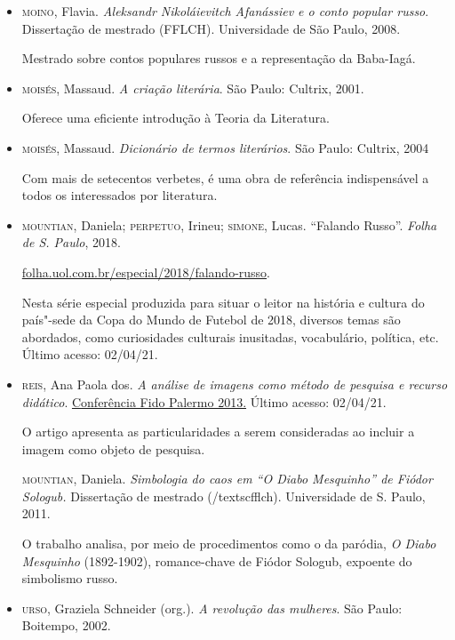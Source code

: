 \documentclass[11pt]{extarticle}
\begin{document}
\begin{itemize}
\item \textsc{moino}, Flavia. \emph{Aleksandr Nikoláievitch Afanássiev e o conto popular russo}. Dissertação de mestrado (FFLCH). Universidade de São Paulo, 2008.

Mestrado sobre contos populares russos e a representação da Baba-Iagá.

\item \textsc{moisés}, Massaud. \emph{A criação literária}. São Paulo: Cultrix, 2001.

Oferece uma eficiente introdução à Teoria da Literatura.

\item \textsc{moisés}, Massaud. \emph{Dicionário de termos literários}. São Paulo:
Cultrix, 2004

Com mais de setecentos verbetes, é uma obra de referência indispensável a todos os interessados por literatura.

\item\textsc{mountian}, Daniela; \textsc{perpetuo}, Irineu; \textsc{simone}, 
Lucas. ``Falando Russo''. \emph{Folha de S. Paulo}, 2018.

\href{https://www1.folha.uol.com.br/especial/2018/falando-russo/\#20}{folha.uol.com.br/especial/2018/falando-russo}.

Nesta série especial produzida para situar o leitor na história e
cultura do país"-sede da Copa do Mundo de Futebol de 2018, diversos temas
são abordados, como curiosidades culturais inusitadas, vocabulário,
política, etc. Último acesso: 02/04/21.

\item \textsc{reis}, Ana Paola dos. \emph{A análise de imagens como método de pesquisa e recurso didático}. 
\href{https://fido.palermo.edu/servicios_dyc/encuentro2010/administracion-concursos/archivos_conf_2013/1131_85939_1689con.pdf}{Conferência Fido Palermo 2013.} 
Último acesso: 02/04/21.

O artigo apresenta as particularidades a serem consideradas ao incluir a imagem como objeto de pesquisa.

\textsc{mountian}, Daniela. \emph{Simbologia do caos em ``O Diabo Mesquinho'' de Fiódor Sologub.} Dissertação de mestrado (/textsc{fflch}). Universidade de S. Paulo, 2011.

O trabalho analisa, por meio de procedimentos como o da paródia, \emph{O Diabo Mesquinho} (1892-1902), romance-chave de Fiódor Sologub, expoente do simbolismo russo.

\item \textsc{urso}, Graziela Schneider (org.). \emph{A revolução das mulheres}. São
Paulo: Boitempo, 2002.


\end{itemize}
\end{document}
